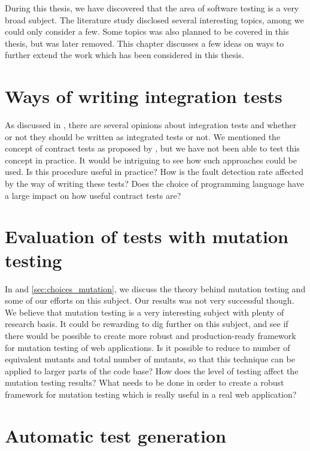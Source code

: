 
During this thesis, we have discovered that the area of software testing
is a very broad subject. The literature study disclosed several
interesting topics, among we could only consider a few. Some topics was
also planned to be covered in this thesis, but was later removed. This
chapter discusses a few ideas on ways to further extend the work which
has been considered in this thesis.\\


\section{Ways of writing integration tests}

As discussed in , there are several
opinions about integration tests and whether or not they should be
written as  integrated tests or not. We mentioned the concept of
contract tests as proposed by \citet{video:integrated_scam}, but we have
not been able to test this concept in practice. It would be intriguing
to see how such approaches could be used. Is this procedure useful in
practice? How is the fault detection rate affected by the way of writing
these tests? Does the choice of programming language have a large impact
on how useful contract tests are?\\


\section{Evaluation of tests with mutation testing}

In  and \ref{sec:choices_mutation}, we discuss
the theory behind mutation testing and some of our efforts on this
subject. Our results was not very successful though. We believe that
mutation testing is a very interesting subject with plenty of research
basis. It could be rewarding to dig further on this subject, and see if
there would be possible to create more robust and production-ready
framework for mutation testing of web applications. Is it possible to
reduce to number of equivalent mutants and total number of mutants, so
that  this technique can be applied to larger parts of the code base?
How does the level of testing affect the mutation testing results? What
needs to be done in order to create a robust framework for mutation
testing which is really useful in a real web application?\\


\section{Automatic test generation}

